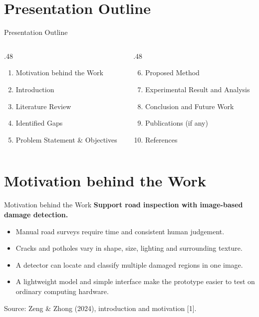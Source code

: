 \documentclass[aspectratio=169,11pt]{beamer}
\newcommand{\source}[1]{\par\vfill{\fontsize{7}{9}\selectfont\color{muted}Source: #1\par}}
\newcommand{\lead}[1]{{\large\bfseries\color{teal}#1}\par\medskip}
\begin{document}
\section{Presentation Outline}
\begin{frame}{Presentation Outline}
\begin{columns}[T]
\begin{column}{.48\textwidth}
\begin{enumerate}
\item Motivation behind the Work\medskip
\item Introduction\medskip
\item Literature Review\medskip
\item Identified Gaps\medskip
\item Problem Statement \& Objectives
\end{enumerate}
\end{column}
\begin{column}{.48\textwidth}
\begin{enumerate}\setcounter{enumi}{5}
\item Proposed Method\medskip
\item Experimental Result and Analysis\medskip
\item Conclusion and Future Work\medskip
\item Publications (if any)\medskip
\item References
\end{enumerate}
\end{column}
\end{columns}
\end{frame}

\section{Motivation behind the Work}
\begin{frame}{Motivation behind the Work}
\lead{Support road inspection with image-based damage detection.}
\begin{itemize}\setlength\itemsep{4mm}
\item Manual road surveys require time and consistent human judgement.
\item Cracks and potholes vary in shape, size, lighting and surrounding texture.
\item A detector can locate and classify multiple damaged regions in one image.
\item A lightweight model and simple interface make the prototype easier to test on ordinary computing hardware.
\end{itemize}
\source{Zeng \& Zhong (2024), introduction and motivation [1].}
\end{frame}
\end{document}
